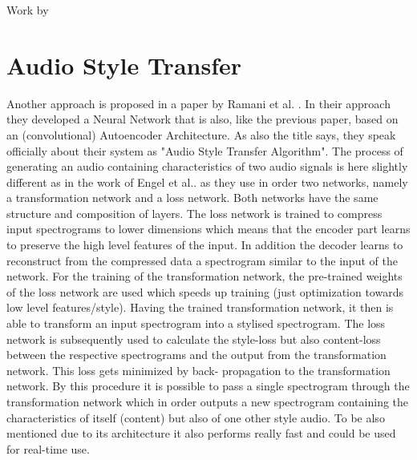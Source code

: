 Work by \cite{sarroff2014musical}

\section{Audio Style Transfer}
Another approach is proposed in a paper by Ramani et al. \cite{Ramani2018}. In their approach they developed a Neural Network that is also, like the previous paper, based on an (convolutional) Autoencoder Architecture. As also the title says, they speak officially about their system as "Audio Style Transfer Algorithm". The process of generating an audio containing characteristics of two audio signals is here slightly different as in the work of Engel et al.. as they use in order two networks, namely a transformation network and a loss network. Both networks have the same structure and composition of layers. The loss network is trained to compress input spectrograms to lower dimensions which means that the encoder part learns to preserve the high level features of the input. In addition the decoder learns to reconstruct from the compressed data a spectrogram similar to the input of the network. For the training of the transformation network, the pre-trained weights of the loss network are used which speeds up training (just optimization towards low level features/style). Having the trained transformation network, it then is able to transform an input spectrogram into a stylised spectrogram. The loss network is subsequently used to calculate the style-loss but also content-loss between the respective spectrograms and the output from the transformation network. This loss gets minimized by back- propagation to the transformation network. By this procedure it is possible to pass a single spectrogram through the transformation network which in order outputs a new spectrogram containing the characteristics of itself (content) but also of one other style audio. To be also mentioned due to its architecture it also performs really fast and could be used for real-time use.\\

